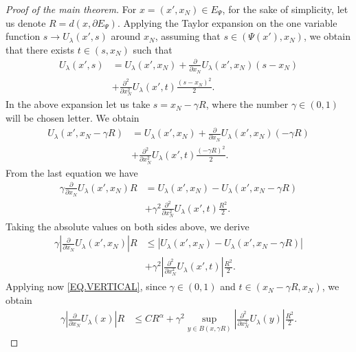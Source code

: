 \documentclass[10pt]{amsart}
\theoremstyle{definition}
\numberwithin{equation}{section}
\begin{document}
\begin{proof}[Proof of the main theorem]
For $x=(x',x_N)\in E_\Psi$,  for the sake of simplicity,  let us denote  $R = d(x,\partial E_\Psi)$.        Applying the
Taylor expansion  on the one variable function      $s\to U_\lambda(x',s)$    around $x_N$,                assuming that
$s\in (\Psi(x'),x_N)$,  we obtain that there exists  $t\in (s,x_N)$  such that
\begin{equation*}\begin{split}
U_\lambda (x', s) & 
=  U_\lambda  (x', x_N) + \frac {\partial } {\partial x_N}  U_\lambda (x',x_N) (s - x_N)  
\\&+ \frac {\partial^2} {\partial x_N^2}  U_\lambda (x',t)  \frac {(s-x_N)^2}2.
\end{split}\end{equation*}
In the above expansion let us take $s = x_N - \gamma R$, where the number $\gamma \in (0,1)$ will be chosen letter.   We
obtain
\begin{equation*}\begin{split}
U_\lambda (x', x_N  -  \gamma  R)  &
=  U_\lambda  (x', x_N) + \frac {\partial } {\partial x_N}  U_\lambda (x',x_N) ( - \gamma R )
 \\&+ \frac {\partial^2} {\partial x_N^2} U_\lambda (x',t)  \frac {(-\gamma R)^2}2.
\end{split}\end{equation*}
From the last equation we have
\begin{equation*}\begin{split}
\gamma \frac {\partial} {\partial x_N}  U_\lambda(x',x_N) R &
= U_\lambda  (x', x_N) - U_\lambda (x', x_N - \gamma R)
\\&+\gamma^2 \frac {\partial^2} {\partial x_N^2}  U_\lambda(x',t)   \frac {R^2}2.
\end{split}\end{equation*}
Taking the   absolute values on both sides above, we derive 
\begin{equation*}\begin{split}
\gamma \left| \frac {\partial } {\partial x_N} U_\lambda (x',x_N) \right|  R &
\le | U_\lambda  (x', x_N) -  U_\lambda (x', x_N - \gamma  R) |
\\& + \gamma^2 \left|\frac {\partial^2} {\partial x_N^2}  U_\lambda(x',t) \right|  \frac {R^2} 2.
\end{split}\end{equation*}
Applying now   \eqref{EQ.VERTICAL},  since $\gamma\in (0,1)$  and  $t\in (x_N - \gamma R,x_N)$,               we  obtain
\begin{equation}\label{EQ.FIRST.PART.1}\begin{split}
\gamma\left| \frac {\partial } {\partial x_N} U _\lambda (x) \right|  R  & \le C R ^{\alpha} + \gamma^2
\sup_{y\in {B}(x, \gamma R)} \left|\frac {\partial^2} {\partial x_N^2} U_\lambda (y) \right|\frac {R^2}2.
\end{split}\end{equation}


\end{proof}
\end{document}
